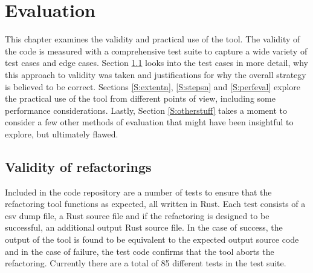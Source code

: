 \chapter{Evaluation}\label{C:eval}
This chapter examines the validity and practical use of the tool. The validity of the code is measured with a comprehensive test suite to capture a wide variety of test cases and edge cases. Section \ref{S:validity} looks into the test cases in more detail, why this approach to validity was taken and justifications for why the overall strategy is believed to be correct. Sections \ref{S:extentn}, \ref{S:stepsn} and \ref{S:perfeval} explore the practical use of the tool from different points of view, including some performance considerations. Lastly, Section \ref{S:otherstuff} takes a moment to consider a few other methods of evaluation that might have been insightful to explore, but ultimately flawed.

\section{Validity of refactorings}\label{S:validity}
Included in the code repository are a number of tests to ensure that the refactoring tool functions as expected, all written in Rust. Each test consists of a csv dump file, a Rust source file and if the refactoring is designed to be successful, an additional output Rust source file. In the case of success, the output of the tool is found to be equivalent to the expected output source code and in the case of failure, the test code confirms that the tool aborts the refactoring. Currently there are a total of 85 different tests in the test suite.






